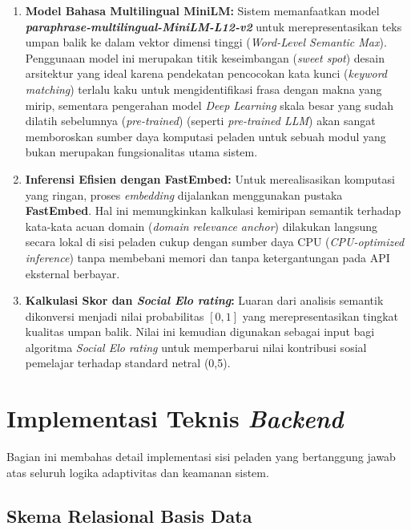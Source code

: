 \begin{enumerate}
    \item \textbf{Model Bahasa Multilingual MiniLM:} Sistem memanfaatkan model \linebreak \textbf{\textit{paraphrase-multilingual-MiniLM-L12-v2}} untuk merepresentasikan teks umpan balik ke dalam vektor dimensi tinggi (\textit{Word-Level Semantic Max}). Penggunaan model ini merupakan titik keseimbangan (\textit{sweet spot}) desain arsitektur yang ideal karena pendekatan pencocokan kata kunci (\textit{keyword matching}) terlalu kaku untuk mengidentifikasi frasa dengan makna yang mirip, sementara pengerahan model \textit{Deep Learning} skala besar yang sudah dilatih sebelumnya (\textit{pre-trained}) (seperti \textit{pre-trained LLM}) akan sangat memboroskan sumber daya komputasi peladen untuk sebuah modul yang bukan merupakan fungsionalitas utama sistem.
    \item \textbf{Inferensi Efisien dengan FastEmbed:} Untuk merealisasikan komputasi yang ringan, proses \textit{embedding} dijalankan menggunakan pustaka \textbf{FastEmbed}. Hal ini memungkinkan kalkulasi kemiripan semantik terhadap kata-kata acuan domain (\textit{domain relevance anchor}) dilakukan langsung secara lokal di sisi peladen cukup dengan sumber daya CPU (\textit{CPU-optimized inference}) tanpa membebani memori dan tanpa ketergantungan pada API eksternal berbayar.
    \item \textbf{Kalkulasi Skor dan \textit{Social Elo rating}:} Luaran dari analisis semantik dikonversi menjadi nilai probabilitas $[0, 1]$ yang merepresentasikan tingkat kualitas umpan balik. Nilai ini kemudian digunakan sebagai input bagi algoritma \textit{Social Elo rating} untuk memperbarui nilai kontribusi sosial pemelajar terhadap standard netral (0,5).
\end{enumerate}

\section{Implementasi Teknis \textit{Backend}}
\label{sec:backend_implementation}

Bagian ini membahas detail implementasi sisi peladen yang bertanggung jawab atas seluruh logika adaptivitas dan keamanan sistem.
\subsection{Skema Relasional Basis Data}
\label{ssec:skema_basis_data}

